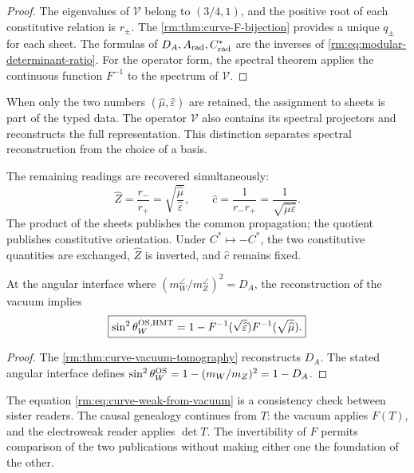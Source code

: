 \begin{proof}
The eigenvalues of \(\mathcal V\) belong to \((3/4,1)\), and the positive root of each constitutive relation is \(r_\pm\). The \cref{rm:thm:curve-F-bijection} provides a unique \(q_\pm\) for each sheet. The formulas of \(D_A,A_{\rm rad},C^*_{\rm rad}\) are the inverses of \cref{rm:eq:modular-determinant-ratio}. For the operator form, the spectral theorem applies the continuous function \(F^{-1}\) to the spectrum of \(\mathcal V\).
\end{proof}

When only the two numbers
\((\widehat\mu,\widehat\varepsilon)\) are retained, the assignment to sheets is part
of the typed data. The operator \(\mathcal V\) also contains its
spectral projectors and reconstructs the full representation. This
distinction separates spectral reconstruction from the choice of a
basis.

The remaining readings are recovered simultaneously:
\begin{equation}
 \widehat Z=\frac{r_-}{r_+}
 =\sqrt{\frac{\widehat\mu}{\widehat\varepsilon}},
 \qquad
 \widehat c=\frac1{r_-r_+}
 =\frac1{\sqrt{\widehat\mu\widehat\varepsilon}}.
 \label{rm:eq:curve-recover-Z-c}
\end{equation}
The product of the sheets publishes the common
propagation; the quotient publishes constitutive
orientation. Under \(C^*\mapsto-C^*\), the two constitutive quantities
are exchanged, \(\widehat Z\) is inverted, and \(\widehat c\) remains fixed.

\begin{corollary}
\label{rm:cor:curve-weak-control}
At the angular interface where
\((m_W^{\angle}/m_Z^{\angle})^2=D_A\), the reconstruction of the vacuum
implies
\begin{equation}
 \boxed{
 \sin^2\theta_W^{\rm OS,HMT}
 =1-F^{-1}(\sqrt{\widehat\varepsilon})
      F^{-1}(\sqrt{\widehat\mu}).}
 \label{rm:eq:curve-weak-from-vacuum}
\end{equation}
\end{corollary}

\begin{proof}
The \cref{rm:thm:curve-vacuum-tomography} reconstructs \(D_A\). The stated angular
interface defines
\(\sin^2\theta_W^{\rm OS}=1-(m_W/m_Z)^2=1-D_A\).
\end{proof}

The equation \cref{rm:eq:curve-weak-from-vacuum} is a consistency check between sister
readers. The causal genealogy continues from \(T\): the vacuum
applies \(F(T)\), and the electroweak reader applies \(\det T\). The
invertibility of \(F\) permits comparison of the two publications without
making either one the foundation of the other.

